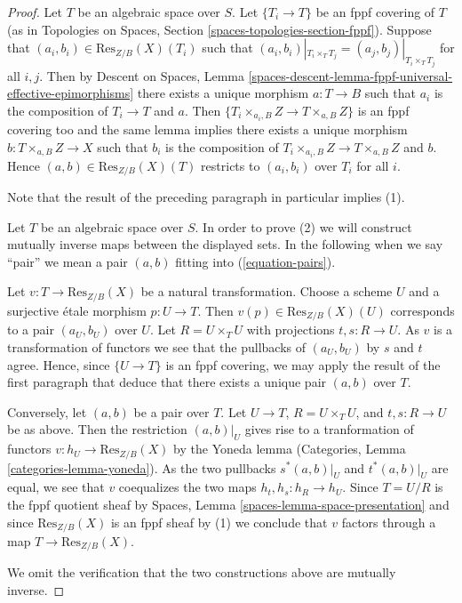 \begin{proof}
Let $T$ be an algebraic space over $S$. Let $\{T_i \to T\}$ be an fppf
covering of $T$ (as in
Topologies on Spaces, Section \ref{spaces-topologies-section-fppf}).
Suppose that $(a_i, b_i) \in \text{Res}_{Z/B}(X)(T_i)$ such
that $(a_i, b_i)|_{T_i \times_T T_j} = (a_j, b_j)|_{T_i \times_T T_j}$
for all $i, j$. Then by
Descent on Spaces,
Lemma \ref{spaces-descent-lemma-fppf-universal-effective-epimorphisms}
there exists a unique morphism $a : T \to B$ such that $a_i$ is the
composition of $T_i \to T$ and $a$. Then
$\{T_i \times_{a_i, B} Z \to T \times_{a, B} Z\}$ is an fppf covering
too and the same lemma implies there exists a unique morphism
$b : T \times_{a, B} Z \to X$ such that $b_i$ is the composition
of $T_i \times_{a_i, B} Z \to T \times_{a, B} Z$ and $b$. Hence
$(a, b) \in \text{Res}_{Z/B}(X)(T)$ restricts to $(a_i, b_i)$ 
over $T_i$ for all $i$.

\medskip\noindent
Note that the result of the preceding paragraph in particular implies (1).

\medskip\noindent
Let $T$ be an algebraic space over $S$. In order to prove (2) we will
construct mutually inverse maps between the displayed sets. In the
following when we say ``pair'' we mean a pair $(a, b)$ fitting
into (\ref{equation-pairs}).

\medskip\noindent
Let $v : T \to \text{Res}_{Z/B}(X)$ be a natural transformation.
Choose a scheme $U$ and a surjective \'etale morphism $p : U \to T$.
Then $v(p) \in \text{Res}_{Z/B}(X)(U)$ corresponds to a pair $(a_U, b_U)$
over $U$. Let $R = U \times_T U$ with projections $t, s : R \to U$.
As $v$ is a transformation of functors we see that the pullbacks of
$(a_U, b_U)$ by $s$ and $t$ agree. Hence, since $\{U \to T\}$ is an
fppf covering, we may apply the result of the first paragraph that
deduce that there exists a unique pair $(a, b)$ over $T$.

\medskip\noindent
Conversely, let $(a, b)$ be a pair over $T$. 
Let $U \to T$, $R = U \times_T U$, and $t, s : R \to U$ be as
above. Then the restriction $(a, b)|_U$ gives rise to a
tranformation of functors $v : h_U \to \text{Res}_{Z/B}(X)$ by the
Yoneda lemma
(Categories, Lemma \ref{categories-lemma-yoneda}).
As the two pullbacks $s^*(a, b)|_U$ and $t^*(a, b)|_U$
are equal, we see that $v$ coequalizes the two maps
$h_t, h_s : h_R \to h_U$. Since $T = U/R$ is the fppf quotient sheaf by
Spaces, Lemma \ref{spaces-lemma-space-presentation}
and since $\text{Res}_{Z/B}(X)$ is an fppf sheaf by (1) we conclude
that $v$ factors through a map $T \to \text{Res}_{Z/B}(X)$.

\medskip\noindent
We omit the verification that the two constructions above are mutually
inverse.
\end{proof}

